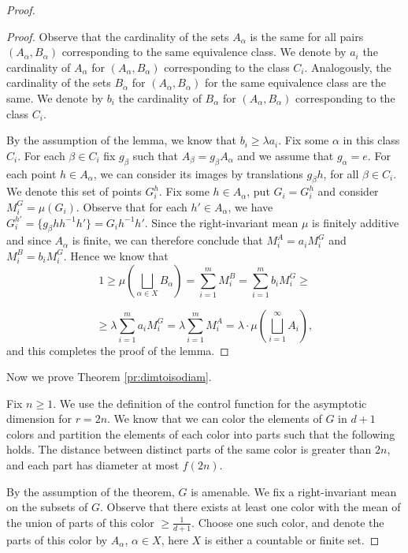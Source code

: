 \documentclass[10pt,a4paper]{amsart}
\begin{document}
\begin{proof}
\begin{proof}
Observe that the cardinality of the sets $A_{\alpha}$ is the same for all
 pairs $(A_{\alpha}, B_{\alpha})$ corresponding to the same equivalence class. We 
denote 
by $a_i$ the cardinality of $A_\alpha$ for $(A_{\alpha}, B_{\alpha})$ corresponding to the class $C_i$. Analogously, the cardinality of the sets
$B_{\alpha}$ for $(A_\alpha, B_{\alpha})$ for the same equivalence class are the same.
We denote  by
$b_i$ the cardinality of $B_{\alpha}$ for $(A_\alpha, B_{\alpha})$
corresponding to the class $C_i$.

 By the assumption of the lemma, we know that $b_i \geqslant \lambda a_i$.
 Fix some $\alpha$ in this class $C_i$.  For each $\beta \in C_i$ fix $g_\beta$ such that $A_{\beta} = g_\beta A_\alpha$ and we assume that $g_\alpha=e$.
For each point $h \in A_\alpha$, we can consider its images by translations
 $g_{\beta} h$, for all $\beta \in C_i$.
We denote this set of points $G_i^h$.
Fix some $h \in A_\alpha$, put $G_i= G_i^h$ and consider $M_i^G = \mu(G_i)$.
Observe that for each $h' \in A_{\alpha}$, we have 
$G_i^{h'} = 
\{g_{\beta} h h^{-1}h'\} = G_i h^{-1}h'$.
Since the right-invariant mean $\mu$ is finitely additive and since $A_\alpha$ is finite, we can 
therefore conclude that  $M_i^A = a_i M_i^G$ and $M_i^B = b_i M_i^G$.
 Hence we know that 
$$
1 \geqslant \mu (\bigsqcup_{\alpha \in X}B_{\alpha}) =
\sum_{i = 1}^{m} M^B_i = \sum_{i = 1}^{m} b_i M^G_i \geqslant
$$
 
$$
\geqslant \lambda \sum_{i = 1}^{m} a_i M^G_i = \lambda \sum_{i = 1}^{m} M^A_i = \lambda \cdot \mu (\bigsqcup_{i = 1}^{\infty} A_i),
$$
 and this completes the proof of the lemma.
\end{proof}


Now we  prove  Theorem \ref{pr:dimtoisodiam}.

Fix $n\ge 1$.
We use the definition of the control function  for the asymptotic dimension for $r=2n$.
We know that  we can color the elements of 
 $G$ in  $d+1$ colors and partition the elements of each color into parts such that the following holds. The distance between distinct parts of the same color is greater than $2n$,
 and each part has diameter at most $f(2n)$.

By the assumption of the theorem,  $G$ is amenable. We fix a right-invariant mean on the subsets of $G$.
Observe that there exists at least one color with the mean of the union of parts
of this color
 $\geqslant \frac{1}{d+1}$. Choose one  such color, and 
  denote the parts of this color by $A_{\alpha}$, $\alpha \in X$, here $X$ is either a countable or finite set.


\end{proof}
\end{document}
